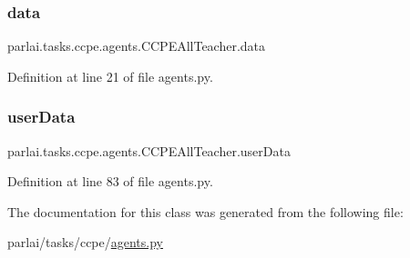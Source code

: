 \subsubsection{\texorpdfstring{data}{data}}
{\footnotesize\ttfamily parlai.\+tasks.\+ccpe.\+agents.\+C\+C\+P\+E\+All\+Teacher.\+data}



Definition at line 21 of file agents.\+py.

\mbox{\label{classparlai_1_1tasks_1_1ccpe_1_1agents_1_1CCPEAllTeacher_ac05613e2339436bf69b6319a197a6ce5}} 
\subsubsection{\texorpdfstring{user\+Data}{userData}}
{\footnotesize\ttfamily parlai.\+tasks.\+ccpe.\+agents.\+C\+C\+P\+E\+All\+Teacher.\+user\+Data}



Definition at line 83 of file agents.\+py.



The documentation for this class was generated from the following file\+:\begin{DoxyCompactItemize}
\item 
parlai/tasks/ccpe/\hyperlink{parlai_2tasks_2ccpe_2agents_8py}{agents.\+py}\end{DoxyCompactItemize}
